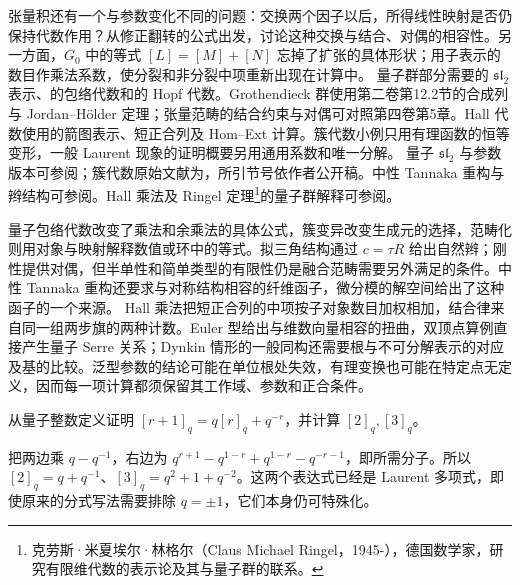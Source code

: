 \ProseParagraphBreak
张量积还有一个与参数变化不同的问题：交换两个因子以后，所得线性映射是否仍保持代数作用？从修正翻转的公式出发，讨论这种交换与结合、对偶的相容性。另一方面，\(G_0\) 中的等式 \([L]=[M]+[N]\) 忘掉了扩张的具体形状；用子表示的数目作乘法系数，使分裂和非分裂中项重新出现在计算中。
\ProseParagraphBreak
量子群部分需要的 \(\mathfrak{sl}_2\) 表示、的包络代数和的 Hopf 代数。Grothendieck 群使用第二卷第12.2节的合成列与 Jordan--Hölder 定理；张量范畴的结合约束与对偶可对照第四卷第5章。Hall 代数使用的箭图表示、短正合列及 Hom--Ext 计算。簇代数小例只用有理函数的恒等变形，一般 Laurent 现象的证明概要另用通用系数和唯一分解。
\ProseParagraphBreak
量子 \(\mathfrak{sl}_2\) 与参数版本可参阅\cite[Section 5.6]{EtingofEtAl2015TensorCategories}；簇代数原始文献为\cite[Sections 2--3, 6]{FominZelevinsky2002ClusterFoundations}，所引节号依作者公开稿。中性 Tannaka 重构与辫结构可参阅\cite[Sections 5.4, 8.1, 8.3]{EtingofEtAl2015TensorCategories}。Hall 乘法及 Ringel 定理\footnote{克劳斯·米夏埃尔·林格尔（Claus Michael Ringel，1945-），德国数学家，研究有限维代数的表示论及其与量子群的联系。}的量子群解释可参阅\cite[作者公开稿, Sections 1.3, 3.3]{Schiffmann2012HallAlgebras}。








\begin{chaptersummary}
	量子包络代数改变了乘法和余乘法的具体公式，簇变异改变生成元的选择，范畴化则用对象与映射解释数值或环中的等式。拟三角结构通过 \(c=\tau R\) 给出自然辫；刚性提供对偶，但半单性和简单类型的有限性仍是融合范畴需要另外满足的条件。中性 Tannaka 重构还要求与对称结构相容的纤维函子，微分模的解空间给出了这种函子的一个来源。
	\ProseParagraphBreak
	Hall 乘法把短正合列的中项按子对象数目加权相加，结合律来自同一组两步旗的两种计数。Euler 型给出与维数向量相容的扭曲，双顶点算例直接产生量子 Serre 关系；Dynkin 情形的一般同构还需要根与不可分解表示的对应及基的比较。泛型参数的结论可能在单位根处失效，有理变换也可能在特定点无定义，因而每一项计算都须保留其工作域、参数和正合条件。
\end{chaptersummary}
\BookExercises
\begin{exercise}\label{b5:ex:B:01}
	从量子整数定义证明 \([r+1]_q=q[r]_q+q^{-r}\)，并计算 \([2]_q,[3]_q\)。
\end{exercise}
\begin{solution}
	把两边乘 \(q-q^{-1}\)，右边为 \(q^{r+1}-q^{1-r}+q^{1-r}-q^{-r-1}\)，即所需分子。所以 \([2]_q=q+q^{-1}\)、\([3]_q=q^2+1+q^{-2}\)。这两个表达式已经是 Laurent 多项式，即使原来的分式写法需要排除 \(q=\pm1\)，它们本身仍可特殊化。
\end{solution}

